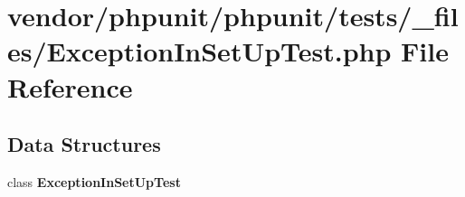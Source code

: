 \section{vendor/phpunit/phpunit/tests/\+\_\+files/\+Exception\+In\+Set\+Up\+Test.php File Reference}
\label{_exception_in_set_up_test_8php}
\subsection*{Data Structures}
\begin{DoxyCompactItemize}
\item 
class {\bf Exception\+In\+Set\+Up\+Test}
\end{DoxyCompactItemize}
